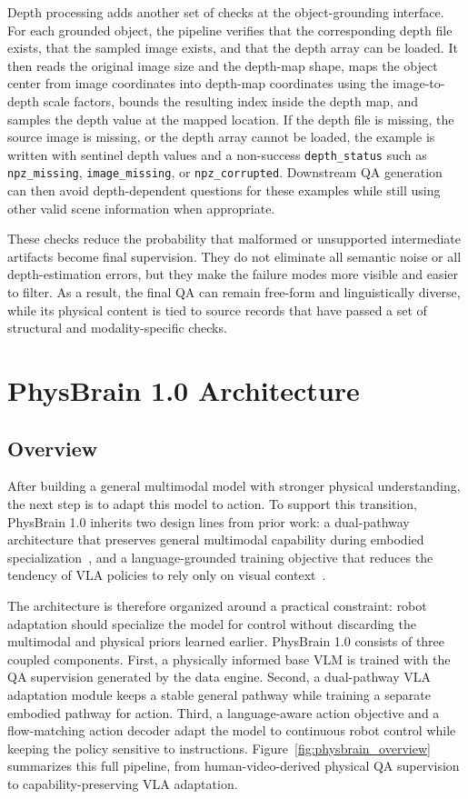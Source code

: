 Depth processing adds another set of checks at the object-grounding interface. For each grounded object, the pipeline verifies that the corresponding depth file exists, that the sampled image exists, and that the depth array can be loaded. It then reads the original image size and the depth-map shape, maps the object center from image coordinates into depth-map coordinates using the image-to-depth scale factors, bounds the resulting index inside the depth map, and samples the depth value at the mapped location. If the depth file is missing, the source image is missing, or the depth array cannot be loaded, the example is written with sentinel depth values and a non-success \texttt{depth\_status} such as \texttt{npz\_missing}, \texttt{image\_missing}, or \texttt{npz\_corrupted}. Downstream QA generation can then avoid depth-dependent questions for these examples while still using other valid scene information when appropriate.

These checks reduce the probability that malformed or unsupported intermediate artifacts become final supervision. They do not eliminate all semantic noise or all depth-estimation errors, but they make the failure modes more visible and easier to filter. As a result, the final QA can remain free-form and linguistically diverse, while its physical content is tied to source records that have passed a set of structural and modality-specific checks.

\section{PhysBrain 1.0 Architecture}
\label{sec:architecture}

\subsection{Overview}

After building a general multimodal model with stronger physical understanding, the next step is to adapt this model to action. To support this transition, PhysBrain 1.0 inherits two design lines from prior work: a dual-pathway architecture that preserves general multimodal capability during embodied specialization~\cite{TwinBrainVLA_2026_arXiv}, and a language-grounded training objective that reduces the tendency of VLA policies to rely only on visual context~\cite{LangForce_2026_arXiv}.

The architecture is therefore organized around a practical constraint: robot adaptation should specialize the model for control without discarding the multimodal and physical priors learned earlier. PhysBrain 1.0 consists of three coupled components. First, a physically informed base VLM is trained with the QA supervision generated by the data engine. Second, a dual-pathway VLA adaptation module keeps a stable general pathway while training a separate embodied pathway for action. Third, a language-aware action objective and a flow-matching action decoder adapt the model to continuous robot control while keeping the policy sensitive to instructions. Figure~\ref{fig:physbrain_overview} summarizes this full pipeline, from human-video-derived physical QA supervision to capability-preserving VLA adaptation.

